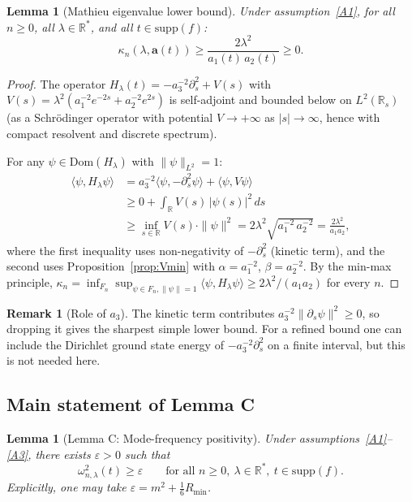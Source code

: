 \documentclass[11pt,a4paper]{article}
\newtheorem{lemma}[theorem]{Lemma}
\theoremstyle{definition}
\newtheorem{remark}[theorem]{Remark}
\newcommand{\R}{\mathbb{R}}
\newcommand{\Lp}{L^2}
\begin{document}
\begin{lemma}[Mathieu eigenvalue lower bound]\label{lem:kappa}
Under assumption~\ref{A1}, for all $n \geq 0$, all $\lambda \in \R^*$, and all
$t \in \mathrm{supp}(f)$:
\begin{equation}\label{eq:kappa_lb}
  \kappa_n(\lambda, \mathbf{a}(t)) \geq \frac{2\lambda^2}{a_1(t)\,a_2(t)} \geq 0.
\end{equation}
\end{lemma}

\begin{proof}
The operator $H_\lambda(t) = -a_3^{-2}\partial_s^2 + V(s)$ with
$V(s) = \lambda^2(a_1^{-2}e^{-2s} + a_2^{-2}e^{2s})$ is self-adjoint and bounded below
on $\Lp(\R_s)$ (as a Schr\"odinger operator with potential $V \to +\infty$ as $|s| \to \infty$,
hence with compact resolvent and discrete spectrum).

For any $\psi \in \mathrm{Dom}(H_\lambda)$ with $\|\psi\|_{L^2} = 1$:
\begin{align*}
  \langle \psi, H_\lambda \psi \rangle
  &= a_3^{-2}\langle \psi, -\partial_s^2 \psi \rangle + \langle \psi, V\psi \rangle
  \\
  &\geq 0 + \int_\R V(s)\,|\psi(s)|^2\,ds
  \\
  &\geq \inf_{s\in\R} V(s) \cdot \|\psi\|^2
   = 2\lambda^2\sqrt{a_1^{-2}\,a_2^{-2}} = \frac{2\lambda^2}{a_1 a_2},
\end{align*}
where the first inequality uses non-negativity of $-\partial_s^2$ (kinetic term),
and the second uses Proposition~\ref{prop:Vmin} with $\alpha = a_1^{-2}$, $\beta = a_2^{-2}$.
By the min-max principle, $\kappa_n = \inf_{F_n} \sup_{\psi \in F_n, \|\psi\|=1}
\langle \psi, H_\lambda \psi \rangle \geq 2\lambda^2/(a_1 a_2)$ for every $n$.
\end{proof}

\begin{remark}[Role of $a_3$]
The kinetic term contributes $a_3^{-2}\|\partial_s \psi\|^2 \geq 0$, so dropping it
gives the sharpest simple lower bound.  For a refined bound one can include
the Dirichlet ground state energy of $-a_3^{-2}\partial_s^2$ on a finite interval,
but this is not needed here.
\end{remark}

\subsection{Main statement of Lemma C}

\begin{lemma}[Lemma C: Mode-frequency positivity]\label{lem:C}
Under assumptions~\ref{A1}--\ref{A3}, there exists $\varepsilon > 0$ such that
\begin{equation}\label{eq:lemC}
  \omega_{n,\lambda}^2(t) \geq \varepsilon
  \qquad \text{for all } n \geq 0,\ \lambda \in \R^*,\ t \in \mathrm{supp}(f).
\end{equation}
Explicitly, one may take $\varepsilon = m^2 + \tfrac{1}{6}R_{\min}$.
\end{lemma}
\end{document}
